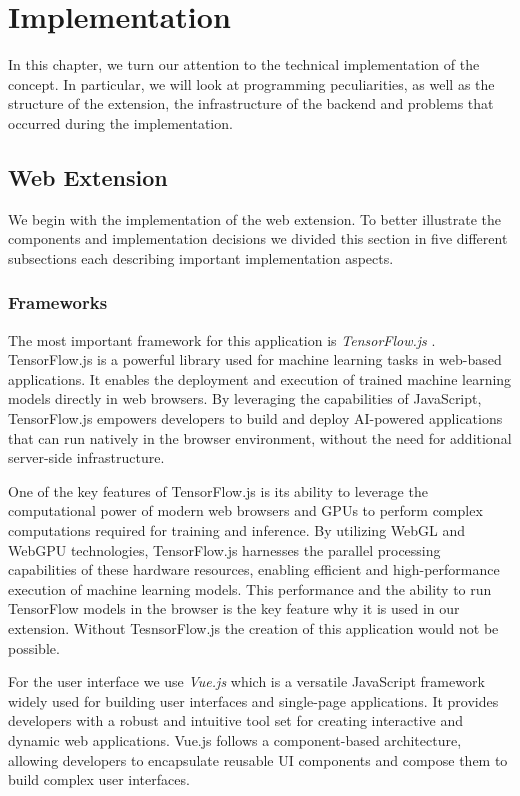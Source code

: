 \chapter{Implementation}

In this chapter, we turn our attention to the technical implementation of the concept. In particular, we will look at programming
peculiarities, as well as the structure of the extension, the infrastructure of the backend and problems that occurred during the implementation.

\section{Web Extension}
We begin with the implementation of the web extension. To better illustrate the components and implementation decisions we divided this section
in five different subsections each describing important implementation aspects.
\subsection{Frameworks}
The most important framework for this application is \emph{TensorFlow.js} \cite{tensorflowJs}.
TensorFlow.js is a powerful library used for machine learning tasks in web-based applications.
It enables the deployment and execution of trained machine learning models directly in web browsers.
By leveraging the capabilities of JavaScript, TensorFlow.js empowers developers to build and deploy AI-powered
applications that can run natively in the browser environment, without the need for additional server-side infrastructure.

One of the key features of TensorFlow.js is its ability to leverage the computational power of modern web browsers and GPUs
to perform complex computations required for training and inference. By utilizing WebGL and WebGPU technologies, TensorFlow.js
harnesses the parallel processing capabilities of these hardware resources, enabling efficient and high-performance execution
of machine learning models. This performance and the ability to run TensorFlow models in the browser is the key feature why it is
used in our extension. Without TesnsorFlow.js the creation of this application would not be possible.

For the user interface we use \emph{Vue.js} \cite{vuejs} which is a versatile JavaScript framework widely used for building user
interfaces and single-page applications. It provides developers with a robust and intuitive tool set for creating interactive
and dynamic web applications. Vue.js follows a component-based architecture, allowing developers to encapsulate reusable
UI components and compose them to build complex user interfaces.

